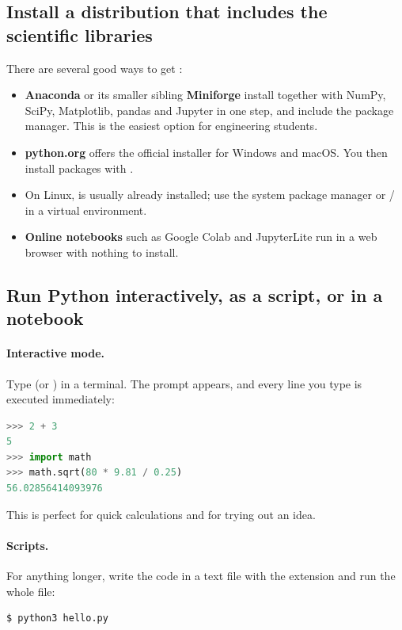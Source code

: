 \subsection*{Install a distribution that includes the scientific libraries}

There are several good ways to get \py:
\begin{itemize}
\item \textbf{Anaconda} or its smaller sibling \textbf{Miniforge} install \py together
  with NumPy, SciPy, Matplotlib, pandas and Jupyter in one step, and include the
   package manager. This is the easiest option for engineering students.
\item \textbf{python.org} offers the official installer for Windows and macOS. You then
  install packages with .
\item On Linux, \py is usually already installed; use the system package manager or
  / in a virtual environment.
\item \textbf{Online notebooks} such as Google Colab and JupyterLite run \py in a web
  browser with nothing to install.
\end{itemize}

\subsection*{Run Python interactively, as a script, or in a notebook}

\paragraph{Interactive mode.} Type  (or ) in a terminal. The
prompt \code{>>>} appears, and every line you type is executed immediately:
\begin{lstlisting}[language=Python]
>>> 2 + 3
5
>>> import math
>>> math.sqrt(80 * 9.81 / 0.25)
56.02856414093976
\end{lstlisting}
This is perfect for quick calculations and for trying out an idea.

\paragraph{Scripts.} For anything longer, write the code in a text file with the extension
 and run the whole file:
\begin{lstlisting}[style=shell]
$ python3 hello.py
\end{lstlisting}

